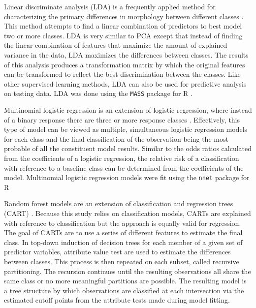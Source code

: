 \documentclass[12pt,letterpaper]{article}\usepackage{graphicx, color}
\begin{document}
Linear discriminate analysis (LDA) is a frequently applied method for characterizing the primary differences in morphology between different classes \citep{Zelditch2004,Mitteroecker2011}. This method attempts to find a linear combination of predictors to best model two or more classes. LDA is very similar to PCA except that instead of finding the linear combination of features that maximize the amount of explained variance in the data, LDA maximizes the differences between classes. The results of this analysis produces a transformation matrix by which the original features can be transformed to reflect the best discrimination between the classes. Like other supervised learning methods, LDA can also be used for predictive analysis on testing data. LDA was done using the \texttt{MASS} package for R \citep{Venables2002a}.

Multinomial logistic regression is an extension of logistic regression, where instead of a binary response there are three or more response classes \citep{Venables2002a}. Effectively, this type of model can be viewed as multiple, simultaneous logistic regression models for each class and the final classification of the observation being the most probable of all the constituent model results. Similar to the odds ratios calculated from the coefficients of a logistic regression, the relative risk of a classification with reference to a baseline class can be determined from the coefficients of the model. Multinomial logistic regression models were fit using the \texttt{nnet} package for R \citep{Venables2002a}

Random forest models are an extension of classification and regression trees (CART) \citep{Breiman1984,Breiman2001}. Because this study relies on classification models, CARTs are explained with reference to classification but the approach is equally valid for regression. The goal of CARTs are to use a series of different features to estimate the final class. In top-down induction of decision trees for each member of a given set of predictor variables, attribute value test are used to estimate the differences between classes. This process is then repeated on each subset, called recursive partitioning. The recursion continues until the resulting observations all share the same class or no more meaningful partitions are possible. The resulting model is a tree structure by which observations are classified at each intersection via the estimated cutoff points from the attribute tests made during model fitting.
\end{document}

